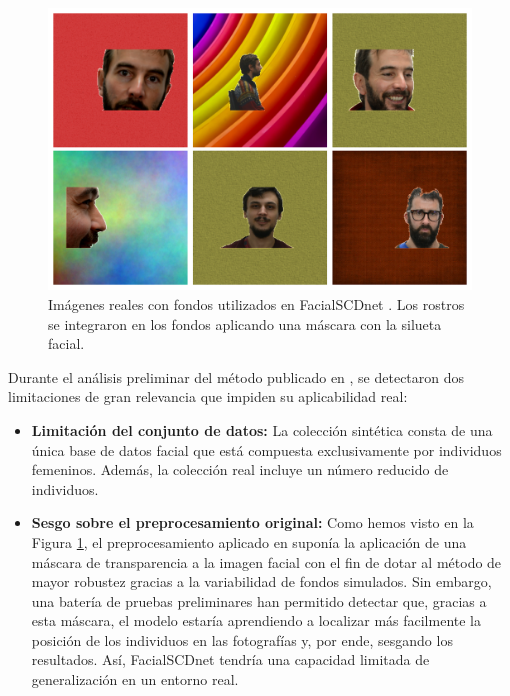 \begin{figure}[h]
	\centering
	\includegraphics[scale=0.3]{imagenes/cap4/figura_FSCDnet.png}
	\caption[Ejemplos de imágenes reales con fondos FacialSCDnet.]{Imágenes reales con fondos utilizados en FacialSCDnet \cite{14}. Los rostros se integraron en los fondos aplicando una máscara con la silueta facial.}
	\label{fig24.2}
\end{figure}

Durante el análisis preliminar del método publicado en 
\cite{14}, se detectaron dos limitaciones de gran relevancia que impiden su aplicabilidad real:

\begin{itemize}
	\item \textbf{Limitación del conjunto de datos:} La colección sintética consta de una única base de datos facial que está compuesta exclusivamente por individuos femeninos. Además, la colección real incluye un número reducido de individuos.
	\item \textbf{Sesgo sobre el preprocesamiento original:} Como hemos visto en la Figura \ref{fig24.2}, el preprocesamiento aplicado en \cite{14} suponía la aplicación de una máscara de transparencia a la imagen facial con el fin de dotar al método de mayor robustez gracias a la variabilidad de fondos simulados. Sin embargo, una batería de pruebas preliminares han permitido detectar que, gracias a esta máscara, el modelo estaría aprendiendo a localizar más facilmente la posición de los individuos en las fotografías y, por ende, sesgando los resultados. Así, FacialSCDnet tendría una capacidad limitada de generalización en un entorno real.
\end{itemize}

